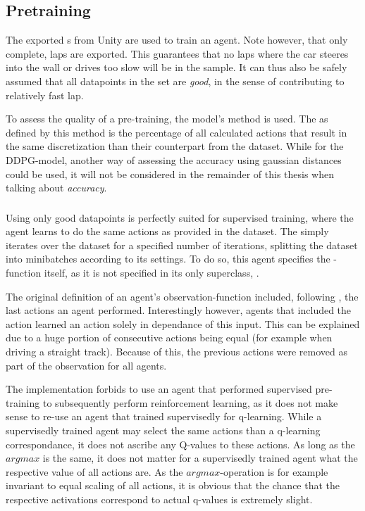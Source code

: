 \subsection{Pretraining}

\label{sec:pretrainingcode}

The exported s from Unity are used to train an agent. Note however, that only complete,  laps are exported. This guarantees that no laps where the car steeres into the wall or drives too slow will be in the sample. It can thus also be safely assumed that all datapoints in the set are \textit{good}, in the sense of contributing to relatively fast lap. 

To assess the quality of a pre-training, the model's method  is used. The  as defined by this method is the percentage of all calculated actions that result in the same discretization than their counterpart from the dataset. While for the DDPG-model, another way of assessing the accuracy using gaussian distances could be used, it will not be considered in the remainder of this thesis when talking about \textit{accuracy}.

\subsubsection{}

Using only good datapoints is perfectly suited for supervised training, where the agent learns to do the same actions as provided in the dataset. The  simply iterates over the dataset for a specified number of iterations, splitting the dataset into minibatches according to its settings. To do so, this agent specifies the -function itself, as it is not specified in its only superclass, .

The original definition of an agent's observation-function included, following \cite{mnih_human-level_2015}, the last actions an agent performed. Interestingly however, agents that included the action learned an action solely in dependance of this input. This can be explained due to a huge portion of consecutive actions being equal (for example when driving a straight track). Because of this, the previous actions were removed as part of the observation for all agents.

The implementation forbids to use an agent that performed supervised pre-training to subsequently perform reinforcement learning, as it does not make sense to re-use an agent that trained supervisedly for q-learning. While a supervisedly trained agent may select the same actions than a q-learning correspondance, it does not ascribe any Q-values to these actions. As long as the $argmax$ is the same, it does not matter for a supervisedly trained agent what the respective value of all actions are. As the $argmax$-operation is for example invariant to equal scaling of all actions, it is obvious that the chance that the respective activations correspond to actual q-values is extremely slight.

